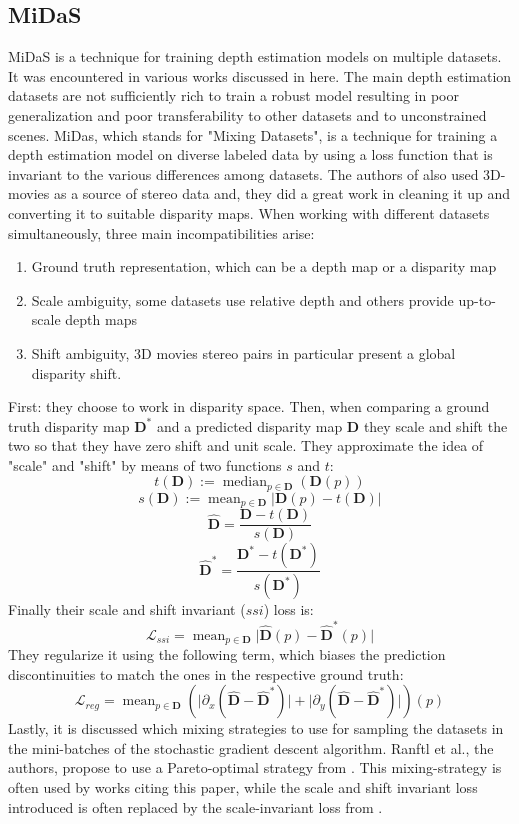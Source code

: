 \subsection{MiDaS}
MiDaS \cite{MiDas} is a technique for training depth estimation models on multiple datasets.
It was encountered in various works discussed in here.
The main depth estimation datasets are not sufficiently rich to train a robust model resulting in poor generalization and poor transferability to other datasets and to unconstrained scenes.
MiDas, which stands for "Mixing Datasets", is a technique for training a depth estimation model on diverse labeled data by using a loss function that is invariant to the various differences among datasets.
The authors of \cite{MiDas} also used 3D-movies as a source of stereo data and, they did a great work in cleaning it up and converting it to suitable disparity maps.
When working with different datasets simultaneously, three main incompatibilities arise:
\begin{enumerate}
	\item Ground truth representation, which can be a depth map or a disparity map
	\item Scale ambiguity, some datasets use relative depth and others provide up-to-scale depth maps
	\item Shift ambiguity, 3D movies stereo pairs in particular present a global disparity shift.
\end{enumerate}
First: they choose to work in disparity space.
Then, when comparing a ground truth disparity map $\mathbf{D}^{*}$ and a predicted disparity map $\mathbf{D}$ they scale and shift the two so that they have zero shift and unit scale.
They approximate the idea of "scale" and "shift" by means of two functions $s$ and $t$:
\[
	t(\mathbf{D}) := \mathop{\text{median}}_{p \in \mathbf{D}}(\mathbf{D}(p))
\] \[
	s(\mathbf{D}) := \mathop{\text{mean}}_{p \in \mathbf{D}} \big| \mathbf{D}(p) - t(\mathbf{D}) \big|
\] \[
	\hat{\mathbf{D}} = \frac{\mathbf{D} - t(\mathbf{D})}{s(\mathbf{D})}
\] \[
	\hat{\mathbf{D}}^{*} = \frac{\mathbf{D}^{*} - t(\mathbf{D}^{*})}{s(\mathbf{D}^{*})}
\]
Finally their scale and shift invariant ($ssi$) loss is:
\[
	\mathcal{L}_{ssi} = \mathop{\text{mean}}_{p \in \mathbf{D}} \big| \hat{\mathbf{D}}(p) - \hat{\mathbf{D}}^{*}(p)\big|
\]
They regularize it using the following term, which biases the prediction discontinuities to match the ones in the respective ground truth:
\[
	\mathcal{L}_{reg} = \mathop{\text{mean}}_{p \in \mathbf{D}}
		\left(
			\big| \partial_{x} (\hat{\mathbf{D}} - \hat{\mathbf{D}}^{*}) \big| +
			\big| \partial_{y} (\hat{\mathbf{D}} - \hat{\mathbf{D}}^{*}) \big| 
		\right)(p)
\]
Lastly, it is discussed which mixing strategies to use for sampling the datasets in the mini-batches of the stochastic gradient descent algorithm.
Ranftl et al., the authors, propose to use a Pareto-optimal strategy from \cite{pareto}.
This mixing-strategy is often used by works citing this paper, while the scale and shift invariant loss introduced is often replaced by the scale-invariant loss from \cite{Eigen}.

